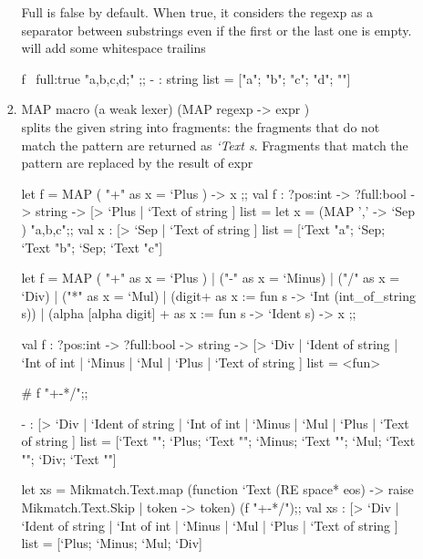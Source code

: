 \begin{enumerate}
\begin{enumerate}[(a)]
\begin{enumerate}
Full is false by default. When true, it considers the regexp
as a separator between substrings even if the first or the last one
is empty. will add some whitespace trailins
\begin{alternate}
f ~full:true "a,b,c,d;"  ;;
- : string list = ["a"; "b"; "c"; "d"; ""]
\end{alternate}
\item MAP macro (a weak lexer) (MAP regexp -> expr ) \\
  splits the given string into fragments: the fragments that do not match the pattern are returned as \textit{`Text s}. Fragments that match the pattern are replaced by the result of expr 

\begin{alternate}
let f = MAP ( "+" as x = `Plus ) -> x ;;
val f : ?pos:int -> ?full:bool -> string -> [> `Plus | `Text of string ] list =
let x =  (MAP ',' -> `Sep ) "a,b,c";;
val x : [> `Sep | `Text of string ] list = [`Text "a"; `Sep; `Text "b"; `Sep; `Text "c"]
\end{alternate}

\begin{redcode}
let f = MAP ( "+" as x = `Plus ) | ("-" as x = `Minus) | ("/" as x = `Div)
  | ("*" as x = `Mul) | (digit+ as x := fun s -> `Int (int_of_string s)) 
  | (alpha [alpha digit] +  as x := fun s -> `Ident s) -> x ;;
\end{redcode}

\begin{bluecode}
val f :
  ?pos:int ->
  ?full:bool ->
  string ->
  [> `Div
   | `Ident of string
   | `Int of int
   | `Minus
   | `Mul
   | `Plus
   | `Text of string ]
list = <fun>
\end{bluecode}
\begin{redcode}
# f "+-*/";;
\end{redcode}

\begin{bluecode}
- : [> `Div
     | `Ident of string
     | `Int of int
     | `Minus
     | `Mul
     | `Plus
     | `Text of string ]
    list
=
[`Text ""; `Plus; `Text ""; `Minus; `Text ""; `Mul; `Text ""; `Div; `Text ""]
\end{bluecode}

\begin{bluecode}
let xs = Mikmatch.Text.map (function `Text (RE space* eos) -> raise Mikmatch.Text.Skip | token -> token) (f "+-*/");;
val xs :
  [> `Div
   | `Ident of string
   | `Int of int
   | `Minus
   | `Mul
   | `Plus
   | `Text of string ]
  list = [`Plus; `Minus; `Mul; `Div]
\end{bluecode}



\end{enumerate}
\end{enumerate}
\end{enumerate}
